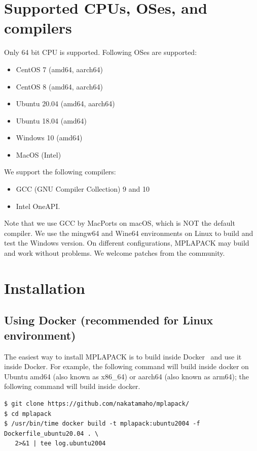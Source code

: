 \documentclass[12pt]{article}
\begin{document}
\section{Supported CPUs, OSes, and compilers}
\label{sec:supportedcpu}
Only 64 bit CPU is supported. Following OSes are supported:

\begin{itemize}
\item CentOS 7 (amd64, aarch64)
\item CentOS 8 (amd64, aarch64)
\item Ubuntu 20.04 (amd64, aarch64)
\item Ubuntu 18.04 (amd64)
\item Windows 10 (amd64)
\item MacOS (Intel)
\end{itemize}

We support the following compilers:
\begin{itemize}
\item GCC (GNU Compiler Collection) 9 and 10
\item Intel OneAPI.
\end{itemize}
Note that we use GCC by MacPorts on macOS, which is NOT the default compiler. We use the mingw64 and Wine64 environments on Linux to build and test the Windows version. On different configurations, MPLAPACK may build and work without problems. We welcome patches from the community.

\section{Installation}
\label{sec:howtoinstall}
\subsection{Using Docker (recommended for Linux environment)}
The easiest way to install MPLAPACK is to build inside Docker~\cite{merkel2014docker} and use it inside Docker. 
For example, the following command will build inside docker on Ubuntu amd64 (also known as x86\_64) or aarch64 (also known as arm64); the following command will build inside docker.

\begin{verbatim}
$ git clone https://github.com/nakatamaho/mplapack/
$ cd mplapack
$ /usr/bin/time docker build -t mplapack:ubuntu2004 -f Dockerfile_ubuntu20.04 . \
   2>&1 | tee log.ubuntu2004
\end{verbatim}
\end{document}
